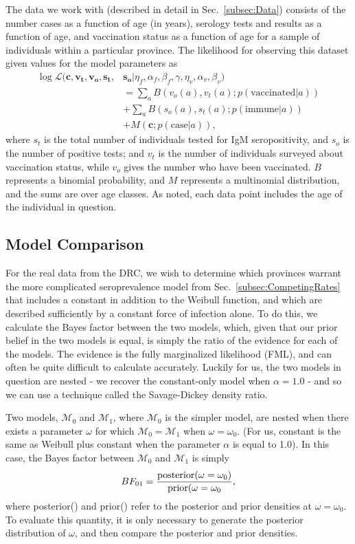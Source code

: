 \documentclass[nofootinbib,aps,pre,twocolumn,superscriptaddress,showkeys,showpacs]{revtex4-1}
\begin{document}
The data we work with (described in detail in Sec.~\ref{subsec:Data}) consists of the number cases as a function of age (in years), serology tests and results as a function of age, and vaccination status as a function of age for a sample of individuals within a particular province. The likelihood for observing this dataset given values for the model parameters as
\begin{align}
\log \mathcal{L} (\mathbf{c}, \mathbf{v_t}, \mathbf{v_o}, \mathbf{s_t},&\mathbf{s_o}|\eta_f, \alpha_f, \beta_f, \gamma, \eta_v, \alpha_v, \beta_v)\nonumber \\ 
& = \sum_aB\left(v_o(a), v_t(a); p(\mathrm{vaccinated}|a)\right) \nonumber \\
&+ \sum_a B\left(s_o(a),s_t(a);p(\mathrm{immune}|a)\right) \nonumber \\
&+ M\left(\mathbf{c};p(\mathrm{case}|a)\right),
\label{eq:loglike}
\end{align}
where $s_t$ is the total number of individuals tested for IgM seropositivity, and $s_o$ is the number of positive tests; and $v_t$ is the number of individuals surveyed about vaccination status, while $v_o$ gives the number who have been vaccinated. $B$ represents a binomial probability, and $M$ represents a multinomial distribution, and the sums are over age classes. As noted, each data point includes the age of the individual in question.

\subsection{Model Comparison}
For the real data from the DRC, we wish to determine which provinces warrant the more complicated seroprevalence model from Sec.~\ref{subsec:CompetingRates} that includes a constant in addition to the Weibull function, and which are described sufficiently by a constant force of infection alone. To do this, we calculate the Bayes factor between the two models, which, given that our prior belief in the two models is equal, is simply the ratio of the evidence for each of the models. The evidence is the fully marginalized likelihood (FML), and can often be quite difficult to calculate accurately. Luckily for us, the two models in question are nested - we recover the constant-only model when $\alpha = 1.0$ -  and so we can use a technique called the Savage-Dickey density ratio.

Two models, $\mathcal{M}_0$ and $\mathcal{M}_1$, where $\mathcal{M}_0$ is the simpler model, are nested when there exists a parameter $\omega$ for which $\mathcal{M}_0 = \mathcal{M}_1$ when $\omega = \omega_0$. (For us, constant is the same as Weibull plus constant when the parameter $\alpha$ is equal to 1.0). In this case, the Bayes factor between $\mathcal{M}_0$ and $\mathcal{M}_1$ is simply
\begin{equation}
BF_{01} = \frac{\rm{posterior}(\omega =\omega_0)}{\rm{prior}(\omega=\omega_0},
\end{equation}
where posterior() and prior() refer to the posterior and prior densities at $\omega = \omega_0$. To evaluate this quantity, it is only necessary to generate the posterior distribution of $\omega$, and then compare the posterior and prior densities.
\end{document}
